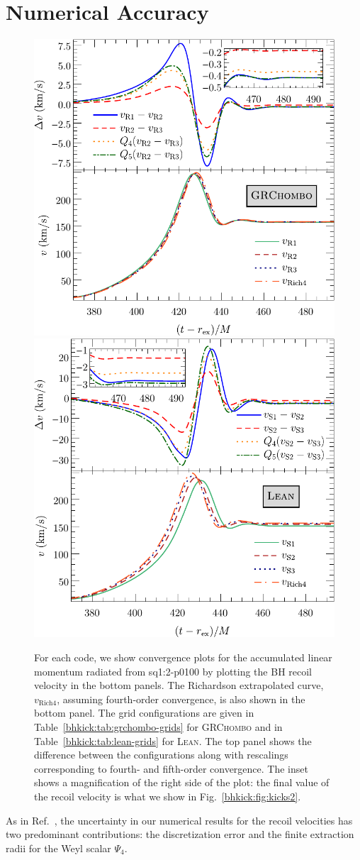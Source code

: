


\section{Numerical Accuracy}
\label{bhkick:sec:accuracy}
\begin{figure}[t]
    \subfloat%
    {
        \includegraphics[width=0.48\linewidth]{bhkick/grchombo-convergence5.pdf}
    }
    \hfill
    \subfloat%
    {
        \includegraphics[width=0.48\linewidth]{bhkick/lean-convergence4.pdf}
    }
    \caption{For each code, we show convergence plots for the
      accumulated linear momentum radiated from \textsf{sq1:2-p0100}
      by plotting the BH recoil velocity in the bottom panels. The
      Richardson extrapolated curve, $v_{\mathrm{Rich4}}$, assuming
      fourth-order convergence, is also shown in the bottom panel. The
      grid configurations are given in Table~\ref{bhkick:tab:grchombo-grids}
      for \textsc{GRChombo} and in Table~\ref{bhkick:tab:lean-grids} for
      \textsc{Lean}. The top panel shows the difference between the
      configurations along with rescalings corresponding to fourth- and
      fifth-order convergence. The inset shows a magnification of the
      right side of the plot: the final value of the recoil
      velocity is what we show in Fig.~\ref{bhkick:fig:kicks2}.} 
    \label{bhkick:fig:convergence}
\end{figure}
As in Ref.~\cite{Sperhake:2019wwo}, the uncertainty in our numerical results 
for the recoil velocities has two predominant contributions: the 
discretization error and the finite extraction radii for the Weyl scalar
$\Psi_4$.

